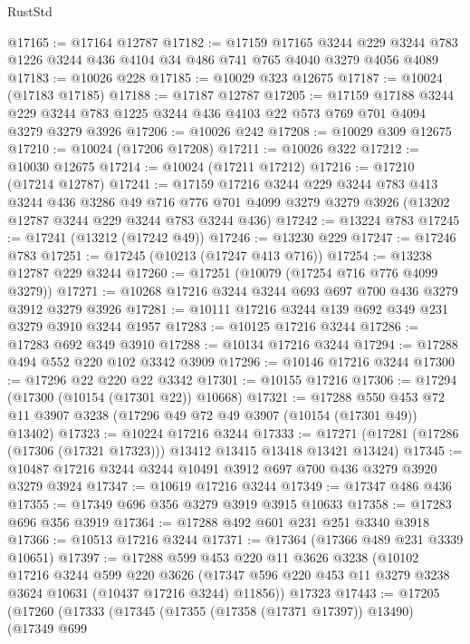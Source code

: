 \begin{lexlean}{RustStd}
\begin{coremodule}
{\begin{coremodule}
{{{{{{{{{{{{{{{{{{{{{{{{{{@17165 := @17164 @12787
@17182 := @17159
    @17165
    @3244
    @229
    @3244
    @783
    @1226
    @3244
    @436
    @4104
    @34
    @486
    @741
    @765
    @4040
    @3279
    @4056
    @4089
@17183 := @10026 @228
@17185 := @10029 @323 @12675
@17187 := @10024 (@17183 @17185)
@17188 := @17187 @12787
@17205 := @17159
    @17188
    @3244
    @229
    @3244
    @783
    @1225
    @3244
    @436
    @4103
    @22
    @573
    @769
    @701
    @4094
    @3279
    @3279
    @3926
@17206 := @10026 @242
@17208 := @10029 @309 @12675
@17210 := @10024 (@17206 @17208)
@17211 := @10026 @322
@17212 := @10030 @12675
@17214 := @10024 (@17211 @17212)
@17216 := @17210 (@17214 @12787)
@17241 := @17159
    @17216
    @3244
    @229
    @3244
    @783
    @413
    @3244
    @436
    @3286
    @49
    @716
    @776
    @701
    @4099
    @3279
    @3279
    @3926
    (@13202 @12787 @3244 @229 @3244 @783 @3244 @436)
@17242 := @13224 @783
@17245 := @17241 (@13212 (@17242 @49))
@17246 := @13230 @229
@17247 := @17246 @783
@17251 := @17245 (@10213 (@17247 @413 @716))
@17254 := @13238 @12787 @229 @3244
@17260 := @17251 (@10079 (@17254 @716 @776 @4099 @3279))
@17271 := @10268 @17216 @3244 @3244 @693 @697 @700 @436 @3279 @3912 @3279 @3926
@17281 := @10111 @17216 @3244 @139 @692 @349 @231 @3279 @3910 @3244 @1957
@17283 := @10125 @17216 @3244
@17286 := @17283 @692 @349 @3910
@17288 := @10134 @17216 @3244
@17294 := @17288 @494 @552 @220 @102 @3342 @3909
@17296 := @10146 @17216 @3244
@17300 := @17296 @22 @220 @22 @3342
@17301 := @10155 @17216
@17306 := @17294 (@17300 (@10154 (@17301 @22)) @10668)
@17321 := @17288
    @550
    @453
    @72
    @11
    @3907
    @3238
    (@17296 @49 @72 @49 @3907 (@10154 (@17301 @49)) @13402)
@17323 := @10224 @17216 @3244
@17333 := @17271 (@17281 (@17286 (@17306 (@17321 @17323))) @13412 @13415 @13418 @13421 @13424)
@17345 := @10487 @17216 @3244 @3244 @10491 @3912 @697 @700 @436 @3279 @3920 @3279 @3924
@17347 := @10619 @17216 @3244
@17349 := @17347 @486 @436
@17355 := @17349 @696 @356 @3279 @3919 @3915 @10633
@17358 := @17283 @696 @356 @3919
@17364 := @17288 @492 @601 @231 @251 @3340 @3918
@17366 := @10513 @17216 @3244
@17371 := @17364 (@17366 @489 @231 @3339 @10651)
@17397 := @17288
    @599
    @453
    @220
    @11
    @3626
    @3238
    (@10102
      @17216
      @3244
      @599
      @220
      @3626
      (@17347 @596 @220 @453 @11 @3279 @3238 @3624 @10631 (@10437 @17216 @3244) @11856))
    @17323
@17443 := @17205
    (@17260
      (@17333
        (@17345
          (@17355 (@17358 (@17371 @17397)) @13490)
          (@17349
            @699
}}}}}}}}}}}}}}}}}}}}}}}}}}
\end{coremodule}}
\end{coremodule}
\end{lexlean}
